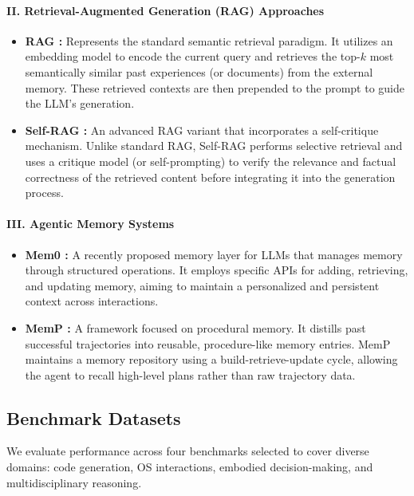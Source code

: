 \documentclass{article}
\theoremstyle{plain}
\theoremstyle{definition}
\theoremstyle{remark}
\begin{document}
\paragraph{II. Retrieval-Augmented Generation (RAG) Approaches}
\begin{itemize}
    \item \textbf{RAG \citep{lewis2020retrieval}:} Represents the standard semantic retrieval paradigm. It utilizes an embedding model to encode the current query and retrieves the top-$k$ most semantically similar past experiences (or documents) from the external memory. These retrieved contexts are then prepended to the prompt to guide the LLM's generation.
    
    \item \textbf{Self-RAG \citep{asai2023selfrag}:} An advanced RAG variant that incorporates a self-critique mechanism. Unlike standard RAG, Self-RAG performs selective retrieval and uses a critique model (or self-prompting) to verify the relevance and factual correctness of the retrieved content before integrating it into the generation process.
\end{itemize}

\paragraph{III. Agentic Memory Systems}
\begin{itemize}
    \item \textbf{Mem0 \citep{chhikara2025mem0}:} A recently proposed memory layer for LLMs that manages memory through structured operations. It employs specific APIs for adding, retrieving, and updating memory, aiming to maintain a personalized and persistent context across interactions.
    
    \item \textbf{MemP \citep{fang2025memp}:} A framework focused on procedural memory. It distills past successful trajectories into reusable, procedure-like memory entries. MemP maintains a memory repository using a build-retrieve-update cycle, allowing the agent to recall high-level plans rather than raw trajectory data.
\end{itemize}

\subsection{Benchmark Datasets}
\label{app:benchmark}
We evaluate performance across four benchmarks selected to cover diverse domains: code generation, OS interactions, embodied decision-making, and multidisciplinary reasoning.
\end{document}
